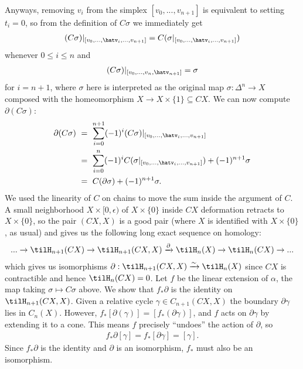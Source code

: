 \begin{homework}[e]
\begin{prf}
    Anyways, removing $v_i$ from the simplex $[v_0,...,v_{n+1}]$ is equivalent to setting $t_i = 0$, so from the definition of $C\sigma$ we immediately get
    \begin{align*}
      (C\sigma)|_{[v_0,...,\hatv_i,...,v_{n+1}]} = C(\sigma|_{[v_0,...,\hatv_i,...,v_{n+1}]})
    \end{align*}
    whenever $0\leq i\leq n$ and
    \begin{align*}
      (C\sigma)|_{[v_0,...,v_n,\hatv_{n+1}]} = \sigma
    \end{align*}
    for $i = n+1$, where $\sigma$ here is interpreted as the original map $\sigma:\Delta^n\to X$ composed with the homeomorphism $X \to X\times \{1\}\subseteq CX$. We can now compute $\partial (C\sigma)$:
    \begin{align*}
      \partial(C\sigma) &~=~ \sum_{i=0}^{n+1}(-1)^i(C\sigma)|_{[v_0,...,\hatv_i,...,v_{n+1}]} \\
                        &~=~\sum_{i=0}^{n} (-1)^iC(\sigma|_{[v_0,...,\hatv_i,...,v_{n+1}]}) + (-1)^{n+1}\sigma \\
                        &~=~ C(\partial \sigma) + (-1)^{n+1}\sigma.
    \end{align*}
    We used the linearity of $C$ on chains to move the sum inside the argument of $C$. A small neighborhood $X \times [0,\epsilon)$ of $X\times \{0\}$ inside $CX$ deformation retracts to $X\times \{0\}$, so the pair $(CX,X)$ is a good pair (where $X$ is identified with $X\times \{0\}$, as usual) and gives us the following long exact sequence on homology:
    \begin{align*}
      ...\to \tilH_{n+1}(CX) \to \tilH_{n+1}(CX,X) \xrightarrow{\partial}\tilH_{n}(X) \to \tilH_n(CX) \to ...
    \end{align*}
    which gives us isomorphisms $\partial:\tilH_{n+1}(CX,X) \xrightarrow{\sim} \tilH_n(X)$ since $CX$ is contractible and hence $\tilH_n(CX) = 0$. Let $f$ be the linear extension of $\alpha$, the map taking $\sigma\mapsto C\sigma$ above. We show that $f_*\partial$ is the identity on $\tilH_{n+1}(CX,X)$. Given a relative cycle $\gamma \in C_{n+1}(CX,X)$ the boundary $\partial \gamma$ lies in $C_n(X)$. However, $f_*[\partial(\gamma)] = [f_*(\partial\gamma)]$, and $f$ acts on $\partial\gamma$ by extending it to a cone. This means $f$ precisely ``undoes'' the action of $\partial$, so
    \begin{align*}
      f_*\partial[\gamma] = f_*[\partial \gamma] = [\gamma].
    \end{align*}
    Since $f_*\partial$  is the identity and $\partial$ is an isomorphism, $f_*$ must also be an isomorphism.


\end{prf}
\end{homework}
